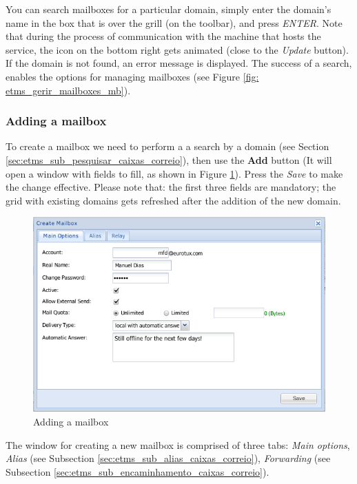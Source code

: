 You can search mailboxes for a particular domain, simply enter the domain's name in the box that is over the grill (on the toolbar), and press \textit{ENTER}. Note that during the process of communication with the machine that hosts the service, the icon on the bottom right gets animated (close to the \textit{Update} button). If the domain is not found, an error message is displayed. The success of a search, enables the options for managing mailboxes (see Figure \ref{fig: etms_gerir_mailboxes_mb}).

\subsubsection{Adding a mailbox}
\label{sec:etms_sub_criar_caixas_correio}
To create a mailbox we need to perform a a search by a domain (see Section \ref{sec:etms_sub_pesquisar_caixas_correio}), then use the \textbf{Add} button (It will open a window with fields to fill, as shown in Figure \ref{fig:etms_criar_mailbox}). Press the \textit{Save} to make the change effective. Please note that: the first three fields are mandatory; the grid with existing domains gets refreshed after the addition of the new domain.

\begin{figure}[H]
    \begin{center}
    \includegraphics[scale=0.45]{screenshots/etms/etms_criar_mailbox.png}
    \caption{Adding a mailbox}
    \label{fig:etms_criar_mailbox}
    \end{center}
\end{figure}

The window for creating a new mailbox is comprised of three tabs: \textit{Main options}, \textit{Alias} ​​(see Subsection \ref{sec:etms_sub_alias_caixas_correio}), \textit{Forwarding} (see Subsection \ref{sec:etms_sub_encaminhamento_caixas_correio}).

